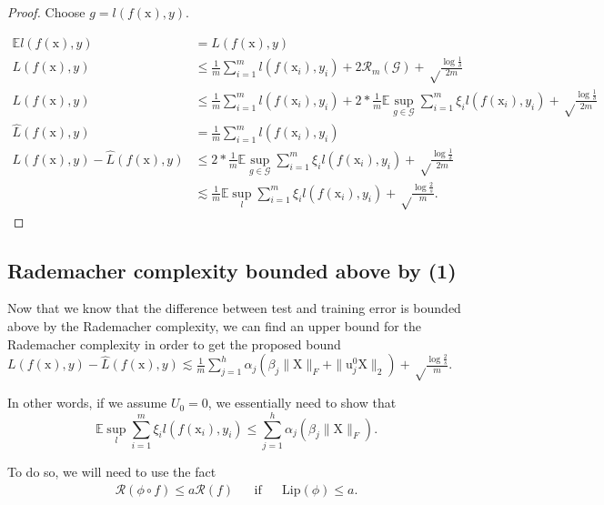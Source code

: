 \documentclass[twoside]{article}
\theoremstyle{definition}
\theoremstyle{definition}
\theoremstyle{remark}
\begin{document}
\begin{proof}

Choose $g = l(f(\text{x}),y)$.

\[
\begin{aligned}
\mathbb{E} l(f(\text{x}),y) &= L(f(\text{x}),y) \\
L(f(\text{x}),y) &\leq \frac{1}{m} \sum \limits_{i=1}^m l(f(\text{x}_i),y_i) + 2 \mathcal{R}_m(\mathcal{G}) + \sqrt\frac{\log \frac{1}{\delta}}{2m} \\
L(f(\text{x}),y) &\leq \frac{1}{m} \sum \limits_{i=1}^m l(f(\text{x}_i),y_i) + 2 * \frac{1}{m} \mathbb{E} \sup \limits_{g\in\mathcal{G}} \sum \limits_{i=1}^m \xi_i l(f(\text{x}_i),y_i) + \sqrt\frac{\log \frac{1}{\delta}}{2m} \\
\hat L(f(\text{x}),y) &= \frac{1}{m}\sum\limits_{i=1}^m l(f(\text{x}_i),y_i) \\
L(f(\text{x}),y) - \hat L(f(\text{x}),y) &\leq 2 * \frac{1}{m} \mathbb{E} \sup \limits_{g\in\mathcal{G}} \sum \limits_{i=1}^m \xi_i l(f(\text{x}_i),y_i) + \sqrt\frac{\log \frac{1}{\delta}}{2m} \\
&\lesssim \frac{1}{m} \mathbb{E} \sup \limits_l \sum\limits_{i=1}^m \xi_i l(f(\text{x}_i),y_i) + \sqrt\frac{\log \frac{2}{s}}{m}.
\end{aligned}
\]

\end{proof}

\subsection{Rademacher complexity bounded above by (1)}

Now that we know that the difference between test and training error is bounded above by the Rademacher complexity, we can find an upper bound for the Rademacher complexity in order to get the proposed bound $L(f(\text{x}),y) - \hat L(f(\text{x}),y) \lesssim \frac{1}{m} \sum\limits_{j=1}^h \alpha_j (\beta_j \| \text{X} \|_F + \| \text{u}_j^0 \text{X} \|_2) + \sqrt\frac{\log \frac{2}{s}}{m}$.

In other words, if we assume $U_0 = 0$, we essentially need to show that
\begin{equation}
\mathbb{E} \sup \limits_l \sum\limits_{i=1}^m \xi_i l(f(\text{x}_i),y_i) \leq \sum\limits_{j=1}^h \alpha_j (\beta_j \| \text{X} \|_F).
\end{equation}

To do so, we will need to use the fact
\[
\begin{aligned}
\mathcal{R}(\phi \circ f) \leq a \mathcal{R}(f) && \text{if} && \text{Lip}(\phi) \leq a.
\end{aligned}
\]
\end{document}
